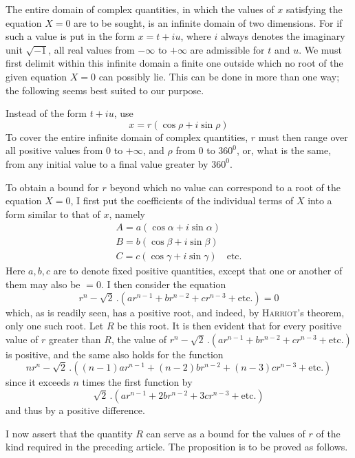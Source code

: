 The entire domain of complex quantities, in which the values of $x$ satisfying the equation $X=0$ are to be sought, is an infinite domain of two dimensions. For if such a value is put in the form $x=t+iu$, where $i$ always denotes the imaginary unit $\surd{-1}$, all real values from $-\infty$ to $+\infty$ are admissible for $t$ and $u$. We must first delimit within this infinite domain a finite one outside which no root of the given equation $X=0$ can possibly lie. This can be done in more than one way; the following seems best suited to our purpose.

Instead of the form $t+iu$, use
\[
x=r(\cos\rho+i\sin\rho)
\]
To cover the entire infinite domain of complex quantities, $r$ must then range over all positive values from $0$ to $+\infty$, and $\rho$ from $0$ to $360^0$, or, what
is the same, from any initial value to a final value greater by $360^0$.

To obtain a bound for $r$ beyond which no value can correspond to a root of the equation $X=0$, I first put the coefficients of the individual terms of $X$ into a form similar to that of $x$, namely
\[
\begin{array}{l}
A=a(\cos\alpha+i\sin\alpha)\\
B=b(\cos\beta+i\sin\beta)\\
C=c(\cos\gamma+i\sin\gamma)\quad\mbox{etc.}
\end{array}
\]
Here $a,b,c$ are to denote fixed positive quantities, except that one or another of them may also be $=0$. I then consider the equation
\[
r^n-\surd2\,.(ar^{n-1}+br^{n-2}+cr^{n-3}+\mbox{etc.})=0
\]
which, as is readily seen, has a positive root, and indeed, by \textsc{Harriot}'s theorem, only one such root. Let $R$ be this root. It is then evident that for every positive value of $r$ greater than $R$, the value of
$r^n-\surd2\,.(ar^{n-1}+br^{n-2}+cr^{n-3}+\mbox{etc.})$
is positive, and the same also holds for the function
\[
nr^n-\surd2\,.((n-1)ar^{n-1}+(n-2)br^{n-2}+(n-3)cr^{n-3}+\mbox{etc.})
\]
since it exceeds $n$ times the first function by
\[
\surd2\,.(ar^{n-1}+2br^{n-2}+3cr^{n-3}+\mbox{etc.})
\]
and thus by a positive difference.

I now assert that the quantity $R$ can serve as a bound for the values of $r$ of the kind required in the preceding article. The proposition is to be proved as follows.

